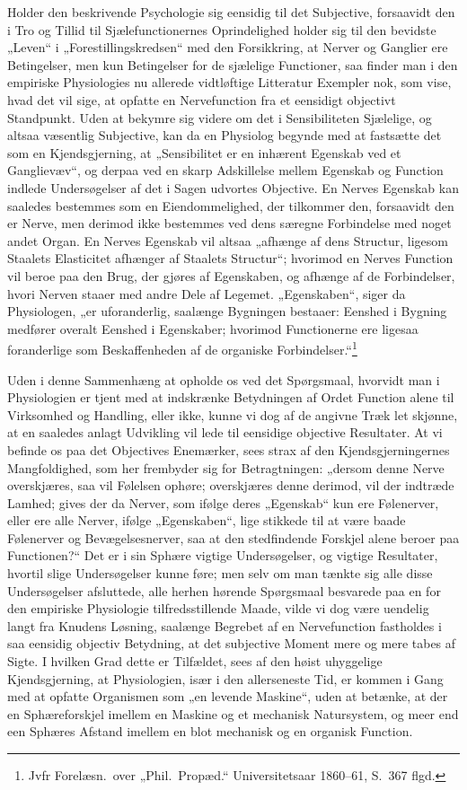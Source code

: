 \documentclass[12pt]{book}
\newcommand{\opage}[1]{\marginnote{\footnotesize\textit{[#1]}}}
\begin{document}
Holder den beskrivende Psychologie sig eensidig til det Subjective, forsaavidt den i Tro og Tillid til
Sjælefunctionernes Oprindelighed holder sig til den bevidste „Leven“ i „Forestillingskredsen“ med den
Forsikkring, at Nerver og Ganglier ere Betingelser, men kun Betingelser for de sjælelige Functioner,
saa finder man i den empiriske Physiologies nu allerede vidtløftige Litteratur Exempler nok, som vise,
hvad det vil sige, at opfatte en Nervefunction fra et eensidigt objectivt Standpunkt. Uden at bekymre
sig videre om det i Sensibiliteten Sjælelige, og altsaa væsentlig Subjective, kan da en Physiolog
begynde med at fastsætte det som en Kjendsgjerning, at „Sensibilitet er en inhærent Egenskab ved et
Ganglievæv“, og derpaa ved en skarp Adskillelse mellem Egenskab og Function indlede Undersøgelser af
det i Sagen udvortes Objective. En Nerves Egenskab kan saaledes bestemmes som en Eiendommelighed, der
tilkommer den, forsaavidt den er Nerve, men derimod ikke bestemmes ved dens særegne Forbindelse med
noget andet Organ. En Nerves Egenskab vil altsaa „afhænge af dens Structur, ligesom
\opage{281} Staalets Elasticitet afhænger af Staalets Structur“; hvorimod en Nerves Function vil beroe paa den
Brug, der gjøres af Egenskaben, og afhænge af de Forbindelser, hvori Nerven staaer med andre Dele af
Legemet. „Egenskaben“, siger da Physiologen, „er uforanderlig, saalænge Bygningen bestaaer: Eenshed i
Bygning medfører overalt Eenshed i Egenskaber; hvorimod Functionerne ere ligesaa foranderlige som
Beskaffenheden af de organiske Forbindelser.“\footnote{Jvfr Forelæsn.\ over „Phil.\ Propæd.“
Universitetsaar 1860--61, S.~367 flgd.}

Uden i denne Sammenhæng at opholde os ved det Spørgsmaal, hvorvidt man i Physiologien er tjent med at
indskrænke Betydningen af Ordet Function alene til Virksomhed og Handling, eller ikke, kunne vi dog af
de angivne Træk let skjønne, at en saaledes anlagt Udvikling vil lede til eensidige objective
Resultater. At vi befinde os paa det Objectives Enemærker, sees strax af den Kjendsgjerningernes
Mangfoldighed, som her frembyder sig for Betragtningen: „dersom denne Nerve overskjæres, saa vil
Følelsen ophøre; overskjæres denne derimod, vil der indtræde Lamhed; gives der da Nerver, som ifølge
deres „Egenskab“ kun ere Følenerver, eller ere alle Nerver, ifølge „Egenskaben“, lige stikkede til at
være baade Følenerver og Bevægelsesnerver, saa at den stedfindende Forskjel alene beroer paa
Functionen?“ Det er i sin Sphære vigtige Undersøgelser, og vigtige Resultater, hvortil slige
Undersøgelser kunne føre; men selv om man tænkte sig alle disse Undersøgelser afsluttede, alle herhen
hørende Spørgsmaal besvarede paa en for den empiriske Physiologie tilfredsstillende Maade, vilde vi dog
være uendelig langt fra Knudens Løsning, saalænge Begrebet af en Nervefunction fastholdes i saa
eensidig objectiv Betydning, at det subjective Moment mere og mere tabes af Sigte. I hvilken Grad dette
er Tilfældet, sees af den høist uhyggelige Kjendsgjerning, at Physiologien, især i den allerseneste
Tid, er kommen i
\opage{282} Gang med at opfatte Organismen som „en levende Maskine“, uden at betænke, at der en Sphæreforskjel
imellem en Maskine og et mechanisk Natursystem, og meer end een Sphæres Afstand imellem en blot
mechanisk og en organisk Function.
\end{document}

